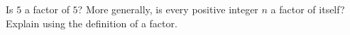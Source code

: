 Is $5$ a factor of $5$? More generally, is every positive integer $n$ a factor of itself? Explain using the definition of a factor.
